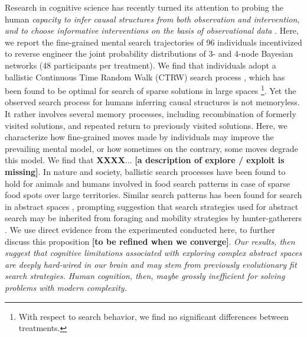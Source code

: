 Research in cognitive science has recently turned its attention to probing the human {\it capacity to infer causal structures from both observation and intervention, and to choose informative interventions on the basis of observational data} \cite{steyvers2003inferring,pearl2009causality}. Here, we report the fine-grained mental search trajectories of 96 individuals incentivized to reverse engineer the joint probability distributions of 3- and 4-node Bayesian networks (48 participants per treatment). We find that individuals adopt a ballistic Continuous Time Random Walk (CTRW) search process \cite{}, which has been found to be optimal for search of sparse solutions in large spaces \cite{viswanathan1999optimizing,edwards2007revisiting,song2010modelling,viswanathan2011physics}\footnote{With respect to search behavior, we find no significant differences between treatments.}. Yet the observed search process for humans inferring causal structures is not memoryless. It rather involves several memory processes, including recombination of formerly visited solutions, and repeated return to previously visited solutions. Here, we characterize how fine-grained moves made by individuals may improve the prevailing mental model, or how sometimes on the contrary, some moves degrade this model. We find that {\bf XXXX}... {\bf [a description of explore / exploit is missing]}. In nature and society, ballistic search processes have been found to hold for animals \cite{baronchelli2013levy} and humans \cite{gonzalez2008understanding,song2010modelling,rhee2011levy} involved in food search patterns in case of sparse food spots over large territories. Similar search patterns has been found for search in abstract spaces \cite{rhodes2007human,radicchi2012rationality,radicchi2012evolution}, prompting suggestion that search strategies used for abstract search \cite{baronchelli2013levy} may be inherited from foraging and mobility strategies by hunter-gatherers \cite{brown2007levy,raichlen2014evidence}. We use direct evidence from the experimented conducted here, to further discuss this proposition {\bf [to be refined when we converge]}. {\it Our results, then suggest that cognitive limitations associated with exploring complex abstract spaces are deeply hard-wired in our brain and may stem from previously evolutionary fit search strategies.  Human cognition, then, maybe grossly inefficient for solving problems with modern complexity.}


